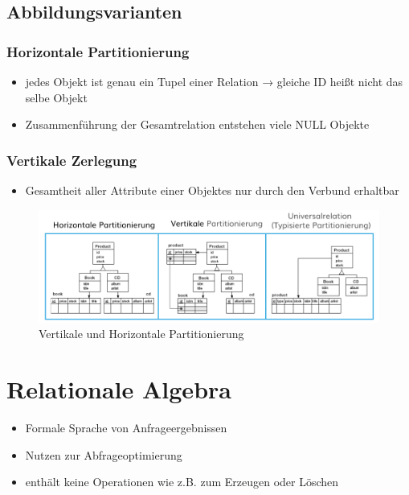 \documentclass[a4paper]{article}
\begin{document}
\subsection{Abbildungsvarianten}
\subsubsection{Horizontale Partitionierung}
\begin{itemize}
    \item jedes Objekt ist genau ein Tupel einer Relation → gleiche ID heißt nicht das selbe Objekt
    \item Zusammenführung der Gesamtrelation entstehen viele NULL Objekte
\end{itemize}

\subsubsection{Vertikale Zerlegung}
\begin{itemize}
    \item Gesamtheit aller Attribute einer Objektes nur durch den Verbund erhaltbar
\end{itemize}

\begin{figure}[htp]
    \centering
    \includegraphics[width=14cm]{images/Partitionierung.png}
    \caption{Vertikale und Horizontale Partitionierung}
    \label{fig:Partitionierung}
\end{figure}

\vspace{5mm}

\section{Relationale Algebra}
\begin{itemize}
    \item Formale Sprache von Anfrageergebnissen
    \item Nutzen zur Abfrageoptimierung
    \item enthält keine Operationen wie z.B. zum Erzeugen oder Löschen
\end{itemize}
\end{document}
